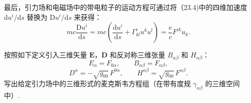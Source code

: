 最后，引力场和电磁场中的带电粒子的运动方程可通过将（23.4)中的四维加速度 $\mathrm{d}u^i/\mathrm{d}s$ 替换为 $\mathrm{D}u^i/\mathrm{d}s$ 来获得：
\begin{equation}
  mc\frac{\mathrm{D}u^i}{\mathrm{d}s}
  =mc\left(\frac{\mathrm{d}u^i}{\mathrm{d}s}
  +\Gamma^i_{kl}u^ku^l\right)
  =\frac{e}{c}F^{ik}u_k.
\end{equation}

\begin{xiti}

\quad 按照如下定义引入三维矢量 $\boldsymbol{E}$，$\boldsymbol{D}$ 和反对称三维张量 $B_{\alpha\beta}$ 和 $H_{\alpha\beta}$：
\begin{equation*}
  E_{\alpha}=F_{0\alpha},\qquad B_{\alpha\beta}=F_{\alpha\beta},
\end{equation*}
\begin{equation*}
  D^{\alpha}=-\sqrt{g_{00}}\,F^{0\alpha},\qquad
  H^{\alpha\beta}=\sqrt{g_{00}}\,F^{\alpha\beta}.
\tag{1}\end{equation*}
写出给定引力场中的三维形式的麦克斯韦方程组（在带有度规 $\gamma_{\alpha\beta}$ 的三维空间中）.


\end{xiti}

